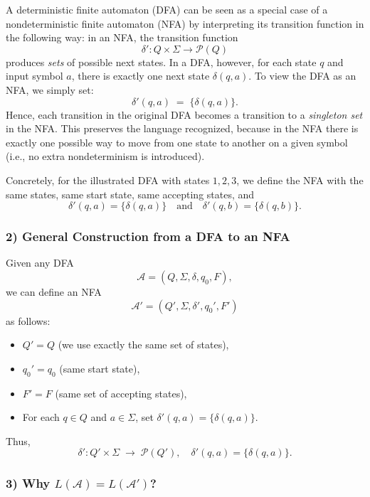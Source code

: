 \documentclass{article}
\theoremstyle{theorem}
\theoremstyle{definition}
\theoremstyle{remark}
\begin{document}
A deterministic finite automaton (DFA) can be seen as a special case of a nondeterministic finite automaton (NFA) by interpreting its transition function in the following way: in an NFA, the transition function 
\[
\delta': Q \times \Sigma \to \mathcal{P}(Q)
\]
produces \emph{sets} of possible next states. In a DFA, however, for each state $q$ and input symbol $a$, there is exactly one next state $\delta(q,a)$. To view the DFA as an NFA, we simply set:
\[
\delta'(q,a) \;=\; \{\delta(q,a)\}.
\]
Hence, each transition in the original DFA becomes a transition to a \emph{singleton set} in the NFA. This preserves the language recognized, because in the NFA there is exactly one possible way to move from one state to another on a given symbol (i.e., no extra nondeterminism is introduced).

Concretely, for the illustrated DFA with states $1,2,3$, we define the NFA with the same states, same start state, same accepting states, and 
\[
\delta'(q,a) = \{\delta(q,a)\}\quad\text{and}\quad
\delta'(q,b) = \{\delta(q,b)\}.
\]

\subsubsection*{2) General Construction from a DFA to an NFA}

Given any DFA 
\[
\mathcal{A} = (Q, \Sigma, \delta, q_0, F),
\]
we can define an NFA
\[
\mathcal{A}' = (Q', \Sigma, \delta', q_0', F')
\]
as follows:
\begin{itemize}
\item $Q' = Q$ (we use exactly the same set of states),
\item $q_0' = q_0$ (same start state),
\item $F' = F$ (same set of accepting states),
\item For each $q \in Q$ and $a \in \Sigma$, set $\delta'(q,a) = \{\delta(q,a)\}$. 
\end{itemize}
Thus,
\[
\delta': Q' \times \Sigma \;\to\; \mathcal{P}(Q'), 
\quad
\delta'(q,a) = \bigl\{\delta(q,a)\bigr\}.
\]

\subsubsection*{3) Why $L(\mathcal{A}) = L(\mathcal{A}')$?}
\end{document}
